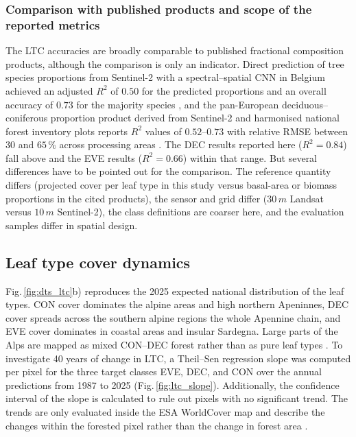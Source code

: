 \documentclass[essd, manuscript]{copernicus}
\begin{document}
\subsubsection{Comparison with published products and scope of the reported metrics}

The LTC accuracies are broadly comparable to published fractional composition products, although the comparison is only an indicator. Direct prediction of tree species proportions from Sentinel-2 with a spectral–spatial CNN in Belgium achieved an adjusted $R^2$ of $0.50$ for the predicted proportions and an overall accuracy of $0.73$ for the majority species \citep{bolyn_mapping_2022}, and the pan-European deciduous–coniferous proportion product derived from Sentinel-2 and harmonised national forest inventory plots reports $R^2$ values of $0.52$–$0.73$ with relative RMSE between $30$ and $65\,\%$ across processing areas \citep{miettinen_pan-european_2025}. The DEC results reported here ($R^2 = 0.84$) fall above and the EVE results ($R^2 = 0.66$) within that range. But several differences have to be pointed out for the comparison. The reference quantity differs (projected cover per leaf type in this study versus basal-area or biomass proportions in the cited products), the sensor and grid differ ($30\,\unit{m}$ Landsat versus $10\,\unit{m}$ Sentinel-2), the class definitions are coarser here, and the evaluation samples differ in spatial design.

\subsection{Leaf type cover dynamics}
\label{sec:ltc_dynamics}

Fig.\,\ref{fig:dts_ltc}b) reproduces the 2025 expected national distribution of the leaf types. CON cover dominates the alpine areas and high northern Apeninnes, DEC cover spreads across the southern alpine regions the whole Apennine chain, and EVE cover dominates in coastal areas and insular Sardegna. Large parts of the Alps are mapped as mixed CON--DEC forest rather than as pure leaf types \citep{mattioli_carta_2025}. To investigate 40 years of change in LTC, a Theil--Sen regression slope \citep{virtanen_scipy_2020} was computed per pixel for the three target classes EVE, DEC, and CON over the annual predictions from 1987 to 2025 (Fig.\,\ref{fig:ltc_slope}). Additionally, the confidence interval of the slope is calculated to rule out pixels with no significant trend. The trends are only evaluated inside the ESA WorldCover map and describe the changes within the forested pixel rather than the change in forest area \citep{gasparini_italian_2022}. 
\end{document}
